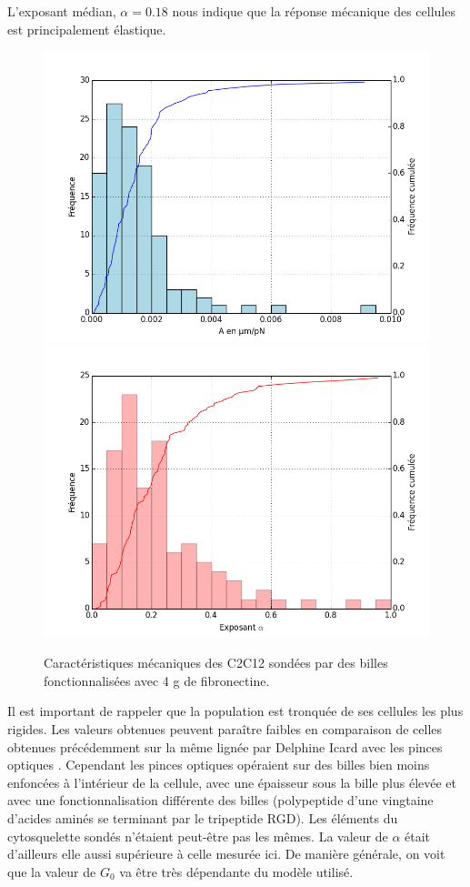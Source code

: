 L'exposant médian, $\alpha=0.18$ nous indique que la réponse mécanique des cellules est principalement élastique.


\begin{figure}
\includegraphics[scale=0.5]{Figures/A0_Toutes.png} 
\includegraphics[scale=0.5]{Figures/E0_Toutes.png} 
\caption{Caractéristiques mécaniques des C2C12 sondées par des billes fonctionnalisées avec 4 \micro g de fibronectine.}
\end{figure}
 
  
Il est important de rappeler que la population est tronquée de ses cellules les plus rigides. 
Les valeurs obtenues peuvent paraître faibles en comparaison de celles obtenues précédemment sur la même lignée par Delphine Icard avec les pinces optiques \cite{icard-arcizet_cell_2008}. Cependant les pinces optiques opéraient sur des billes bien moins enfoncées à l'intérieur de la cellule, avec une épaisseur sous la bille plus élevée et avec une fonctionnalisation différente des billes (polypeptide d’une vingtaine d’acides aminés se terminant par le tripeptide RGD). Les éléments du cytosquelette sondés n’étaient peut-être pas les mêmes. La valeur de $\alpha$ était d’ailleurs elle aussi supérieure à celle mesurée ici. De manière générale, on voit que la valeur de $G_0$ va être très dépendante du modèle utilisé. 

